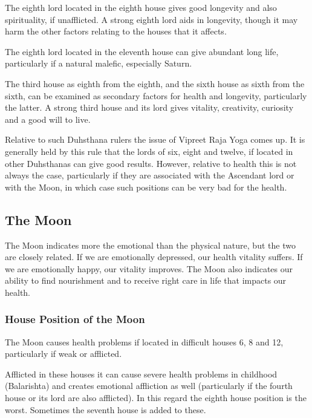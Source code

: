  

The eighth lord located in the eighth house gives good longevity and also spirituality, if unafflicted. A strong eighth lord aids in longevity, though it may harm the other factors relating to the houses that it affects.
 

The eighth lord located in the eleventh house can give abundant long life, particularly if a natural malefic, especially Saturn.

 

The third house as eighth from the eighth, and the sixth house as sixth from the sixth, can be examined as secondary factors for health and longevity, particularly the latter. A strong third house and its lord gives vitality, creativity, curiosity and a good will to live.

 

Relative to such Duhsthana rulers the issue of Vipreet Raja Yoga comes up. It is generally held by this rule that the lords of six, eight and twelve, if located in other Duhsthanas can give good results. However, relative to health this is not always the case, particularly if they are associated with the Ascendant lord or with the Moon, in which case such positions can be very bad for the health.

 

\subsection{The Moon}
 

The Moon indicates more the emotional than the physical nature, but the two are closely related. If we are emotionally depressed, our health vitality suffers. If we are emotionally happy, our vitality improves. The Moon also indicates our ability to find nourishment and to receive right care in life that impacts our health.

 

\subsubsection{House Position of the Moon}

The Moon causes health problems if located in difficult houses 6, 8 and 12, particularly if weak or afflicted.
 

Afflicted in these houses it can cause severe health problems in childhood (Balarishta) and creates emotional affliction as well (particularly if the fourth house or its lord are also afflicted). In this regard the eighth house position is the worst. Sometimes the seventh house is added to these.

